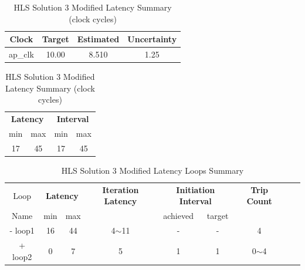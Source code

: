 \begin{table}[H]
	\centering
	\begin{minipage}[t]{0.45\linewidth}
		\centering
		\begin{tabular}{|c|c|c|c|}
			\hline
			\textbf{Clock} & \textbf{Target} & \textbf{Estimated} & \textbf{Uncertainty} \\
			\hline
			ap\_clk & 10.00 & 8.510 & 1.25 \\
			\hline
		\end{tabular}
		\caption{HLS Solution 3 Modified Timing Summary (ns)}
		\label{tab:hls-solution-3-modified-timing-summary}
	\end{minipage}
	\hfill
	\begin{minipage}[t]{0.45\linewidth}
		\centering
		\begin{tabular}{|c|c|c|c|}
			\hline
			\multicolumn{2}{|c|}{\textbf{Latency}} & \multicolumn{2}{|c|}{\textbf{Interval}} \\
			min & max & min & max \\
			\hline
			17 & 45 & 17 & 45 \\
			\hline
		\end{tabular}
		\caption{HLS Solution 3 Modified Latency Summary (clock cycles)}
		\label{tab:hls-solution-3-modified-latency-summary}
	\end{minipage}
\end{table}

\begin{table}[H]
	\centering
	\begin{tabular}{|c|c|c|c|c|c|c|c|c|}
		\hline
		\multicolumn{1}{|c|}{Loop} & \multicolumn{2}{|c|}{\textbf{Latency}} & \multicolumn{1}{c|}{\textbf{Iteration Latency}} & \multicolumn{2}{c|}{\textbf{Initiation Interval}} & \multicolumn{1}{c|}{\textbf{Trip Count}}  \\
		Name & min & max &  & achieved & target &  \\
		\hline
		- loop1 & 16 & 44 & 4$\sim$11 & - & - & 4 \\
		+ loop2 & 0 & 7 & 5 & 1 & 1 & 0$\sim$4 \\
		\hline
	\end{tabular}
	\caption{HLS Solution 3 Modified Latency Loops Summary}
	\label{tab:hls-solution-3-modified-loop-summary}
\end{table}

